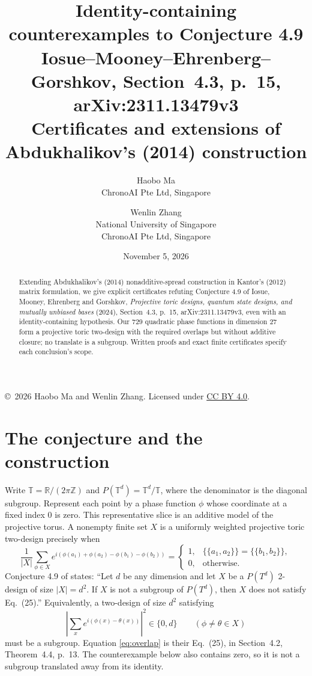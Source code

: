 \documentclass[11pt]{article}
\title{Identity-containing counterexamples to Conjecture 4.9\\
\large Iosue--Mooney--Ehrenberg--Gorshkov, Section~4.3, p.~15, arXiv:2311.13479v3\\
Certificates and extensions of Abdukhalikov's (2014) construction}
\author{Haobo Ma\\\small ChronoAI Pte Ltd, Singapore\and Wenlin Zhang\\\small National University of Singapore\\\small ChronoAI Pte Ltd, Singapore}
\date{November 5, 2026}
\newcommand{\T}{\mathbb T}
\begin{document}
\maketitle
\begin{abstract}
Extending Abdukhalikov's (2014) nonadditive-spread construction in Kantor's (2012) matrix formulation, we give explicit certificates refuting Conjecture 4.9 of Iosue, Mooney, Ehrenberg and Gorshkov, \emph{Projective toric designs, quantum state designs, and mutually unbiased bases} (2024), Section~4.3, p.~15, arXiv:2311.13479v3, even with an identity-containing hypothesis. Our 729 quadratic phase functions in dimension 27 form a projective toric two-design with the required overlaps but without additive closure; no translate is a subgroup. Written proofs and exact finite certificates specify each conclusion's scope.
\end{abstract}
\noindent\small\copyright\ 2026 Haobo Ma and Wenlin Zhang. Licensed under
\href{https://creativecommons.org/licenses/by/4.0/}{CC BY 4.0}.\normalsize

\section{The conjecture and the construction}
Write $\T=\mathbb R/(2\pi\mathbb Z)$ and $P(\T^d)=\T^d/\T$, where the denominator is the diagonal subgroup. Represent each point by a phase function $\phi$ whose coordinate at a fixed index $0$ is zero. This representative slice is an additive model of the projective torus. A nonempty finite set $X$ is a uniformly weighted projective toric two-design precisely when
\begin{equation}\label{eq:moment}
\frac1{|X|}\sum_{\phi\in X}e^{i(\phi(a_1)+\phi(a_2)-\phi(b_1)-\phi(b_2))}
=\begin{cases}1,&\{\!\{a_1,a_2\}\!\}=\{\!\{b_1,b_2\}\!\},\\0,&\text{otherwise.}\end{cases}
\end{equation}
Conjecture 4.9 of \cite[Section 4.3, p.~15]{iosue} states: ``Let $d$ be any dimension and let $X$ be a $P(T^d)$ 2-design of size $|X|=d^2$. If $X$ is not a subgroup of $P(T^d)$, then $X$ does not satisfy Eq.~(25).'' Equivalently, a two-design of size $d^2$ satisfying
\begin{equation}\label{eq:overlap}
\left|\sum_x e^{i(\phi(x)-\theta(x))}\right|^2\in\{0,d\}
\qquad(\phi\ne\theta\in X)
\end{equation}
must be a subgroup. Equation \eqref{eq:overlap} is their Eq.~(25), in Section~4.2, Theorem~4.4, p.~13.
The counterexample below also contains zero, so it is not a subgroup translated away from its identity.
\end{document}
